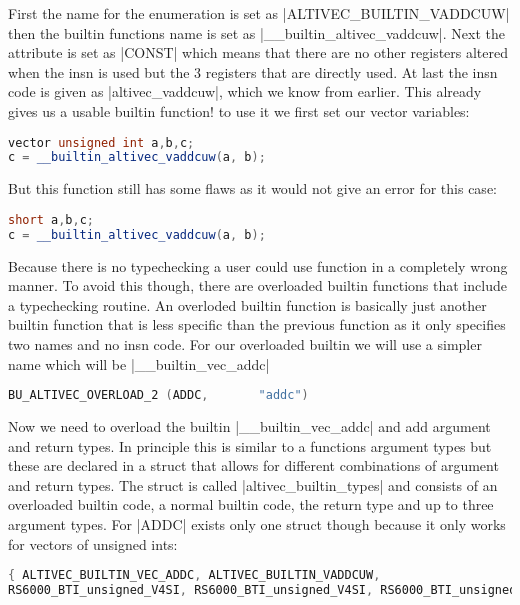 First the name for the enumeration is set as |ALTIVEC_BUILTIN_VADDCUW| then the builtin functions name is set as |__builtin_altivec_vaddcuw|. Next the attribute is set as |CONST| which means that there are no other registers altered when the insn is used but the 3 registers that are directly used. At last the insn code is given as |altivec_vaddcuw|, which we know from earlier. This already gives us a usable builtin function! to use it we first set our vector variables:
\begin{lstlisting}[language=C++,basicstyle=\ttfamily\scriptsize,keywordstyle=\color{red}]
vector unsigned int a,b,c;
c = __builtin_altivec_vaddcuw(a, b);
\end{lstlisting}
But this function still has some flaws as it would not give an error for this case:
\begin{lstlisting}[language=C++,basicstyle=\ttfamily\scriptsize,keywordstyle=\color{red}]
short a,b,c;
c = __builtin_altivec_vaddcuw(a, b);
\end{lstlisting}
Because there is no typechecking a user could use function in a completely wrong manner. To avoid this though, there are overloaded builtin functions that include a typechecking routine.
An overloded builtin function is basically just another builtin function that is less specific than the previous function as it only specifies two names and no insn code. For our overloaded builtin we will use a simpler name which will be  |__builtin_vec_addc|

\begin{lstlisting}[language=C++,basicstyle=\ttfamily\scriptsize,keywordstyle=\color{red}]
BU_ALTIVEC_OVERLOAD_2 (ADDC,	   "addc")
\end{lstlisting}

Now we need to overload the builtin |__builtin_vec_addc| and add argument and return types. In principle this is similar to a functions argument types but these are declared in a struct that allows for different combinations of argument and return types. The struct is called |altivec_builtin_types| and consists of an overloaded builtin code, a normal builtin code, the return type and up to three argument types. For |ADDC| exists only one struct though because it only works for vectors of unsigned ints:

\begin{lstlisting}[language=C++,basicstyle=\ttfamily\scriptsize,keywordstyle=\color{red}]
{ ALTIVEC_BUILTIN_VEC_ADDC, ALTIVEC_BUILTIN_VADDCUW,
RS6000_BTI_unsigned_V4SI, RS6000_BTI_unsigned_V4SI, RS6000_BTI_unsigned_V4SI, 0 }			
\end{lstlisting}
    
